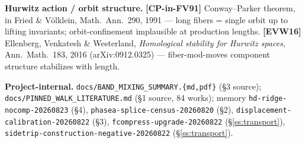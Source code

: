 \documentclass[11pt]{article}
\newcommand{\code}[1]{\texttt{#1}}
\begin{document}
\textbf{Hurwitz action / orbit structure.}
\textbf{[CP-in-FV91]} Conway--Parker theorem, in Fried \& V\"olklein, Math.\ Ann.\ 290, 1991 --- long
fibers = single orbit up to lifting invariants; orbit-confinement implausible at production lengths.
\textbf{[EVW16]} Ellenberg, Venkatesh \& Westerland, \emph{Homological stability for Hurwitz spaces},
Ann.\ Math.\ 183, 2016 (arXiv:0912.0325) --- fiber-mod-moves component structure stabilizes with length.

\textbf{Project-internal.}
\code{docs/BAND\_MIXING\_SUMMARY.\{md,pdf\}} (\S3 source);
\code{docs/PINNED\_WALK\_LITERATURE.md} (\S1 source, 84 works);
memory \code{hd-ridge-nocomp-20260823} (\S4), \code{phasea-splice-census-20260820} (\S2),
\code{displacement-calibration-20260822} (\S3), \code{fcompress-upgrade-20260822}
(\S\ref{ss:transport}), \code{sidetrip-construction-negative-20260822} (\S\ref{ss:transport}).
\end{document}
